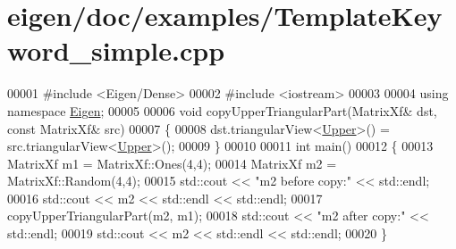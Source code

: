 \hypertarget{eigen_2doc_2examples_2_template_keyword__simple_8cpp_source}{}\section{eigen/doc/examples/\+Template\+Keyword\+\_\+simple.cpp}
\label{eigen_2doc_2examples_2_template_keyword__simple_8cpp_source}

\begin{DoxyCode}
00001 \textcolor{preprocessor}{#include <Eigen/Dense>}
00002 \textcolor{preprocessor}{#include <iostream>}
00003 
00004 \textcolor{keyword}{using namespace }\hyperlink{namespace_eigen}{Eigen};
00005 
00006 \textcolor{keywordtype}{void} copyUpperTriangularPart(MatrixXf& dst, \textcolor{keyword}{const} MatrixXf& src)
00007 \{
00008   dst.triangularView<\hyperlink{group__enums_gga39e3366ff5554d731e7dc8bb642f83cda6bcb58be3b8b8ec84859ce0c5ac0aaec}{Upper}>() = src.triangularView<\hyperlink{group__enums_gga39e3366ff5554d731e7dc8bb642f83cda6bcb58be3b8b8ec84859ce0c5ac0aaec}{Upper}>();
00009 \}
00010 
00011 \textcolor{keywordtype}{int} main()
00012 \{
00013   MatrixXf m1 = MatrixXf::Ones(4,4);
00014   MatrixXf m2 = MatrixXf::Random(4,4);
00015   std::cout << \textcolor{stringliteral}{"m2 before copy:"} << std::endl;
00016   std::cout << m2 << std::endl << std::endl;
00017   copyUpperTriangularPart(m2, m1);
00018   std::cout << \textcolor{stringliteral}{"m2 after copy:"} << std::endl;
00019   std::cout << m2 << std::endl << std::endl;
00020 \}
\end{DoxyCode}
